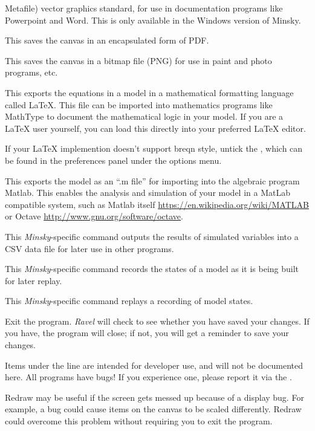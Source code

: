 \begin{description}
\begin{description}
Metafile) vector graphics standard, for use in documentation programs
like Powerpoint and Word. This is only available in the Windows
version of Minsky.
\item[Postscript] This saves the canvas in an encapsulated form of PDF.
\item[Portable Network Graphics] This saves the canvas in a bitmap file (PNG)
for use in paint and photo programs, etc. 
\item [LaTeX] This exports the equations in a model in a mathematical formatting
language called \LaTeX. This file can be imported into mathematics
programs like MathType to document the mathematical logic in your
model. If you are a \LaTeX{} user yourself, you can load this directly
into your preferred \LaTeX{} editor.

If your LaTeX implemention doesn't support breqn style, untick the , which can be found in the
preferences panel under the options menu. 
\item [Matlab] This exports the model as an ``.m file'' for importing into
the algebraic program Matlab. This enables the analysis and simulation
of your model in a MatLab compatible system, such as Matlab itself
\url{https://en.wikipedia.org/wiki/MATLAB} or Octave \url{http://www.gnu.org/software/octave}.
\end{description}
\item [{Log simulation}] This \emph{Minsky}-specific command outputs the
results of simulated variables into a CSV data file for later use
in other programs.
\item [{Recording}] This \emph{Minsky}-specific command records the states
of a model as it is being built for later replay.
\item [{Replay recording}] This \emph{Minsky}-specific command replays
a recording of model states.
\item [{Quit}] Exit the program. \emph{Ravel} will check to see whether
you have saved your changes. If you have, the program will close;
if not, you will get a reminder to save your changes.
\item [{Debugging use}] Items under the line are intended for developer
use, and will not be documented here. All programs have bugs! If you
experience one, please report it via the .
\item [{Redraw}] Redraw may be useful if the screen gets messed up because
of a display bug. For example, a bug could cause items on the canvas
to be scaled differently. Redraw could overcome this problem without
requiring you to exit the program.
\end{description}

